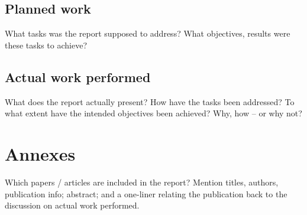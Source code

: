 \documentclass[a4paper,11pt,pdf]{pacmanreport}
\begin{document}
\subsection{Planned work}

What tasks was the report supposed to address? What objectives, results were these tasks to achieve?

\subsection{Actual work performed}

What does the report actually present? How have the tasks been addressed? To what extent have the intended objectives been achieved? Why, how -- or why not?













\section{Annexes}

Which papers / articles are included in the report? Mention titles, authors, publication info; abstract; and a one-liner relating the publication back to the discussion on actual work performed.




\end{document}
